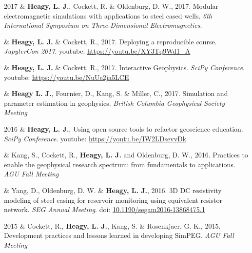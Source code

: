 \documentclass[a4paper, 11pt]{article}
\newcommand{\doi}[1]{doi: \href{https://doi.org/#1}{#1}}
\newcommand{\youtube}[1]{youtube: \href{https://youtu.be/XY3Tq9Wd1\_A}{#1}}
\begin{document}
\begin{entryright}
2017 & \textbf{Heagy, L. J.}, Cockett, R. \& Oldenburg, D. W., 2017. Modular electromagnetic simulations with applications to steel cased wells. \emph{6th International Symposium on Three-Dimensional Electromagnetics}.
\end{entryright}

\begin{entryright}
& \textbf{Heagy, L. J.} \& Cockett, R., 2017. Deploying a reproducible course. \emph{JupyterCon 2017}. \youtube{https://youtu.be/XY3Tq9Wd1\_A}
\end{entryright}

\begin{entryright}
& \textbf{Heagy, L. J.} \& Cockett, R., 2017. Interactive Geophysics. \emph{SciPy Conference}. \youtube{https://youtu.be/NuUe2ja5LCE}
\end{entryright}

\begin{entryright}
& \textbf{Heagy L. J.}, Fournier, D., Kang, S. \& Miller, C., 2017. Simulation and parameter estimation in geophysics. \emph{British Columbia Geophysical Society Meeting}
\end{entryright}

\begin{entryright}
2016 & \textbf{Heagy, L. J.},  Using open source tools to refactor geoscience education. \emph{SciPy Conference}. \youtube{https://youtu.be/IW2LDsevvDk}
\end{entryright}

\begin{entryright}
& Kang, S., Cockett, R., \textbf{Heagy, L. J.} and Oldenburg, D. W., 2016. Practices to enable the geophysical research spectrum: from fundamentals to applications. \emph{AGU Fall Meeting}
\end{entryright}

\begin{entryright}
& Yang, D., Oldenburg, D. W. \& \textbf{Heagy, L. J.}, 2016. 3D DC resistivity modeling of steel casing for reservoir monitoring using equivalent resistor network. \emph{SEG Annual Meeting}. \doi{10.1190/segam2016-13868475.1}
\end{entryright}

\begin{entryright}
2015 & Cockett, R., \textbf{Heagy, L. J.}, Kang, S. \& Rosenkjaer, G. K., 2015. Development practices and lessons learned in developing SimPEG. \emph{AGU Fall Meeting}
\end{entryright}
\end{document}
